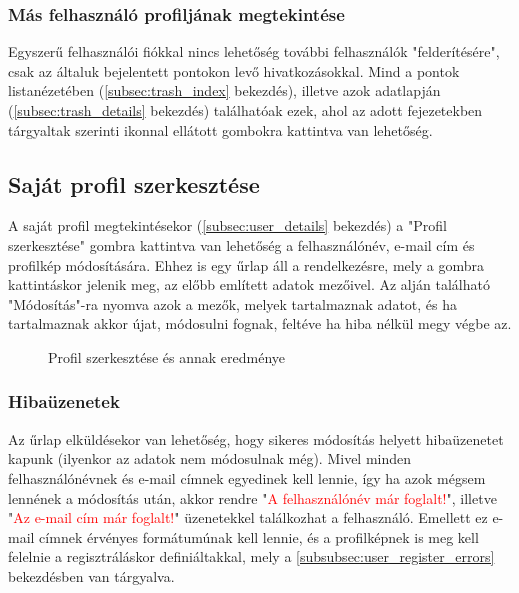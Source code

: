 \subsubsection{Más felhasználó profiljának megtekintése}

Egyszerű felhasználói fiókkal nincs lehetőség további felhasználók "felderítésére", csak az általuk bejelentett pontokon levő hivatkozásokkal. Mind a pontok listanézetében (\ref{subsec:trash_index} bekezdés), illetve azok adatlapján (\ref{subsec:trash_details} bekezdés) találhatóak ezek, ahol az adott fejezetekben tárgyaltak szerinti  ikonnal ellátott gombokra kattintva van lehetőség.

\subsection{Saját profil szerkesztése}
\label{subsec:user_edit}

A saját profil megtekintésekor (\ref{subsec:user_details} bekezdés) a "Profil szerkesztése" gombra kattintva van lehetőség a felhasználónév, e-mail cím és profilkép módosítására. Ehhez is egy űrlap áll a rendelkezésre, mely a gombra kattintáskor jelenik meg, az előbb említett adatok mezőivel. Az alján található "Módosítás"-ra nyomva azok a mezők, melyek tartalmaznak adatot, és ha tartalmaznak akkor újat, módosulni fognak, feltéve ha hiba nélkül megy végbe az.

\begin{figure}[H]
	\centering
	\hspace{5pt}
	\caption{Profil szerkesztése és annak eredménye}
	\label{fig:user_edit}
\end{figure}

\subsubsection{Hibaüzenetek}

Az űrlap elküldésekor van lehetőség, hogy sikeres módosítás helyett hibaüzenetet kapunk (ilyenkor az adatok nem módosulnak  még). Mivel minden felhasználónévnek és e-mail címnek egyedinek kell lennie, így ha azok mégsem lennének a módosítás után, 
akkor rendre "\textcolor{red}{A felhasználónév már foglalt!}", illetve "\textcolor{red}{Az e-mail cím már foglalt!}" üzenetekkel találkozhat a felhasználó. Emellett ez e-mail címnek érvényes formátumúnak kell lennie, és a profilképnek is meg kell felelnie a regisztráláskor definiáltakkal, mely a \ref{subsubsec:user_register_errors} bekezdésben van tárgyalva.

